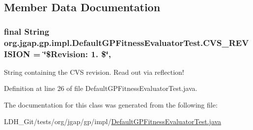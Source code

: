 \subsection{Member Data Documentation}
\hypertarget{classorg_1_1jgap_1_1gp_1_1impl_1_1_default_g_p_fitness_evaluator_test_a1130b21d99d20ea333b312dd8a6b75c7}{
\subsubsection[{C\-V\-S\-\_\-\-R\-E\-V\-I\-S\-I\-O\-N}]{\setlength{\rightskip}{0pt plus 5cm}final String org.\-jgap.\-gp.\-impl.\-Default\-G\-P\-Fitness\-Evaluator\-Test.\-C\-V\-S\-\_\-\-R\-E\-V\-I\-S\-I\-O\-N = \char`\"{}\$Revision\-: 1. \$\char`\"{}\hspace{0.3cm}{\ttfamily [static]}, {\ttfamily [private]}}}\label{classorg_1_1jgap_1_1gp_1_1impl_1_1_default_g_p_fitness_evaluator_test_a1130b21d99d20ea333b312dd8a6b75c7}
String containing the C\-V\-S revision. Read out via reflection! 

Definition at line 26 of file Default\-G\-P\-Fitness\-Evaluator\-Test.\-java.



The documentation for this class was generated from the following file\-:\begin{DoxyCompactItemize}
\item 
L\-D\-H\-\_\-\-Git/tests/org/jgap/gp/impl/\hyperlink{_default_g_p_fitness_evaluator_test_8java}{Default\-G\-P\-Fitness\-Evaluator\-Test.\-java}\end{DoxyCompactItemize}

